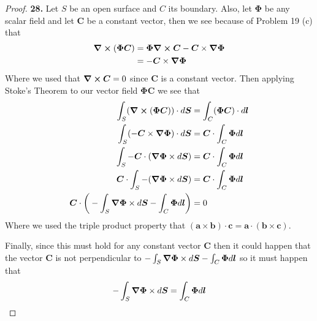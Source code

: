 \documentclass[11pt]{article}
\theoremstyle{definition}
\begin{document}
\begin{proof}{\textbf{28.}}
    Let $S$ be an open surface and $C$ its boundary.
    Also, let $\bm{\Phi}$ be any scalar field and let $\bm{C}$ be a
    constant vector, then we see because of Problem 19 (c) that
    \begin{align*}
        \curl (\bm{\Phi C}) &= \bm{\Phi} \curl\bm{C}
            - \bm{C} \times \gradient \bm{\Phi}\\
            &= - \bm{C} \times \gradient \bm{\Phi}
    \end{align*}
    Where we used that $\curl\bm{C} = 0$ since $\bm{C}$ is a constant vector.
    Then applying Stoke's Theorem to our vector field $\bm{\Phi C}$ we see that
    \begin{align*}
        \int_S (\curl(\bm{\Phi C}))\cdot d\bm{S}
        &= \int_C (\bm{\Phi C}) \cdot d\bm{l}\\
        \int_S (- \bm{C} \times \gradient \bm{\Phi}) \cdot d\bm{S}
        &= \bm{C} \cdot \int_C \bm{\Phi} d\bm{l}\\
        \int_S - \bm{C} \cdot (\gradient \bm{\Phi} \times d\bm{S})
        &= \bm{C} \cdot \int_C \bm{\Phi} d\bm{l}\\
        \bm{C} \cdot \int_S - (\gradient \bm{\Phi} \times d\bm{S})
        &= \bm{C} \cdot \int_C \bm{\Phi} d\bm{l}\\
        \bm{C}\cdot \bigg(
            -\int_S \gradient \bm{\Phi} \times d\bm{S}
            - \int_C \bm{\Phi} d\bm{l}
        \bigg) &= 0
    \end{align*}
    Where we used the triple product property that
    $(\bm{a} \times \bm{b}) \cdot \bm{c} = \bm{a} \cdot(\bm{b} \times \bm{c})$.
 
    Finally, since this must hold for any constant vector $\bm{C}$ then it
    could happen that the vector $\bm{C}$ is not perpendicular to
    $-\int_S \gradient \bm{\Phi} \times d\bm{S} - \int_C \bm{\Phi} d\bm{l}$
    so it must happen that
    $$-\int_S \gradient \bm{\Phi} \times d\bm{S} = \int_C \bm{\Phi} d\bm{l}$$
\end{proof}
\cleardoublepage
\end{document}
